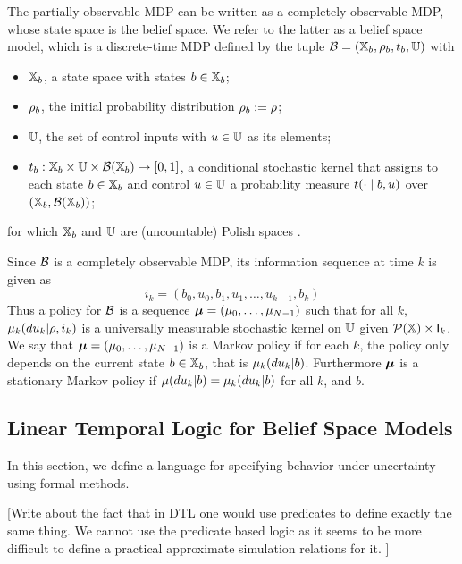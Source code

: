 \documentclass{ifacconf}
\newcommand{\red}[1]{{\color{red} #1}}
\begin{document}
 The partially observable MDP can be written as a completely observable MDP, whose state space is the belief space. We refer to the latter as a belief space model, which is a
discrete-time MDP defined by the tuple $\mathcal{B} = ({{\mathbb{X}}_b}, \rho_b, t_b, {\mathbb{U}})$ with
  \begin{itemize}
    \item ${{\mathbb{X}}_b}$,  a state space with states $b\in{{\mathbb{X}}_b}$; %
    \item $\rho_b$, the initial probability distribution $\rho_b:=\rho$;
    \item ${\mathbb{U}}$, the set of control inputs with $u\in{\mathbb{U}}$ as its elements;
    \item $t_b:{{\mathbb{X}}_b}\times{\mathbb{U}}\times\mathcal B({{\mathbb{X}}_b})\rightarrow[0,1]$, a conditional stochastic kernel that assigns to each state $b\in {{\mathbb{X}}_b}$ and control $u\in {\mathbb{U}}$ a probability measure $t(\cdot\mid b,u)$ over $({{\mathbb{X}}_b},\mathcal B({{\mathbb{X}}_b}))$;
  \end{itemize}
  for which ${{\mathbb{X}}_b}$ and ${\mathbb{U}}$ are (uncountable) Polish spaces \citep{bertsekas2004stochastic}.

Since $\mathcal{B}$ is a completely observable MDP, its information sequence at time $k$ is given as  
\[i_k=(b_0, u_0, b_1, u_1, \ldots, u_{k-1},b_k)\]
Thus	a policy for $\mathcal{B}$ is a sequence ${\boldsymbol{\mu}}=({\mu}_0,\ldots,{\mu}_{N-1})$ such that  for all $k$, ${\mu}_k(du_k|\rho, i_k)$ is a universally measurable stochastic kernel on ${\mathbb{U}}$  given $\mathcal{P}({\mathbb{X}})\times {\mathsf{I}}_k$.
	We say that ${\boldsymbol{\mu}}=({\mu}_0,\ldots,{\mu}_{N-1})$ is a Markov policy if for each $k$, the policy only depends on the current state $b\in{{\mathbb{X}}_b}$, that is ${\mu}_k(du_k|b)$.
	Furthermore 	 ${\boldsymbol{\mu}}$ is a stationary Markov policy if ${\mu}(du_k|b)= {\mu}_k(du_k|b)$ for all $k$, and $b$.
	
	

\subsection{Linear Temporal Logic for Belief Space Models}

	In this section, we define a language for specifying behavior under uncertainty using formal methods. 
	
	
	\red{[Write about the fact that in DTL one would use predicates to define exactly the same thing. We cannot use the predicate based logic as it seems to be more difficult to define a practical approximate simulation relations for it. ]}
	
\end{document}
